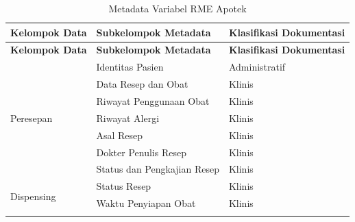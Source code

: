\documentclass[bahasa, 12pt, a4paper, onecolumn, oneside, final]{report}
\begin{document}
\begin{longtable}{|p{4cm}|p{5.2cm}|p{3.2cm}|}
	\caption{Metadata Variabel RME Apotek}
	\label{tab:metadata-rme-apotek}                                        \\
	\hline
	\textbf{Kelompok Data}        &
	\textbf{Subkelompok Metadata} &
	\textbf{Klasifikasi Dokumentasi}                                       \\ \hline
	\endfirsthead

	\hline
	\textbf{Kelompok Data}        &
	\textbf{Subkelompok Metadata} &
	\textbf{Klasifikasi Dokumentasi}                                       \\ \hline
	\endhead

	\multirow{7}{4cm}{Peresepan}
	                              & Identitas Pasien
	                              & Administratif                          \\ \cline{2-3}

	                              & Data Resep dan Obat
	                              & Klinis                                 \\ \cline{2-3}

	                              & Riwayat Penggunaan Obat
	                              & Klinis                                 \\ \cline{2-3}

	                              & Riwayat Alergi
	                              & Klinis                                 \\ \cline{2-3}

	                              & Asal Resep
	                              & Klinis                                 \\ \cline{2-3}

	                              & Dokter Penulis Resep
	                              & Klinis                                 \\ \cline{2-3}

	                              & Status dan Pengkajian Resep
	                              & Klinis                                 \\ \hline

	\multirow{5}{4cm}{Dispensing}
	                              & Status Resep
	                              & Klinis                                 \\ \cline{2-3}

	                              & Waktu Penyiapan Obat
	                              & Klinis                                 \\ \cline{2-3}


\end{longtable}
\end{document}
